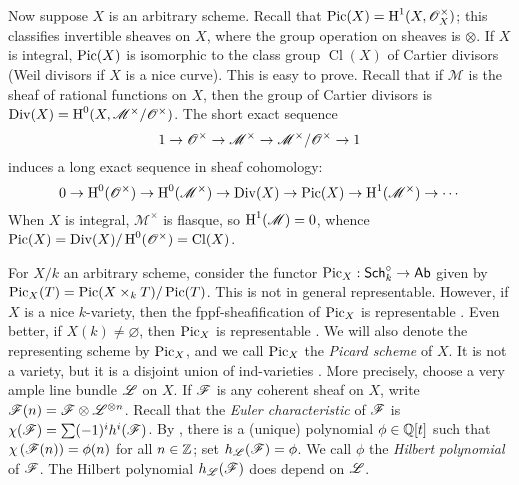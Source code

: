 \documentclass{article}
\begin{document}


Now suppose $X$ is an arbitrary scheme. Recall that 
$\operatorname{Pic}(X)=\operatorname{H}^1(X,\mathscr{O}_X^\times)$; this classifies invertible sheaves on 
$X$, where the group operation on sheaves is $\otimes$. If $X$ is integral, 
$\operatorname{Pic}(X)$ is isomorphic to the class group $\operatorname{Cl}(X)$ of Cartier 
divisors (Weil divisors if $X$ is a nice curve). This is easy to prove. Recall 
that if $\mathscr{M}$ is the sheaf of rational functions on $X$, then the 
group of Cartier divisors is $\operatorname{Div}(X) = \operatorname{H}^0(X,\mathscr{M}^\times/\mathscr{O}^\times)$. 
The short exact sequence 
\[
  1 \to \mathscr{O}^\times \to \mathscr{M}^\times\to \mathscr{M}^\times/\mathscr{O}^\times \to 1
\]
induces a long exact sequence in sheaf cohomology:
\[
  0 \to \operatorname{H}^0(\mathscr{O}^\times) \to \operatorname{H}^0(\mathscr{M}^\times) \to \operatorname{Div}(X) \to \operatorname{Pic}(X) \to \operatorname{H}^1(\mathscr{M}^\times) \to \cdots
\]
When $X$ is integral, $\mathscr{M}^\times$ is flasque, so 
$\operatorname{H}^1(\mathscr{M}) = 0$, whence 
$\operatorname{Pic}(X)=\operatorname{Div}(X)/\operatorname{H}^0(\mathscr{O}^\times) = \operatorname{Cl}(X)$. 

For $X/k$ an arbitrary scheme, consider the functor 
$\operatorname{Pic}_X:\mathsf{Sch}_k^\circ\to\mathsf{Ab}$ given by 
$\operatorname{Pic}_X(T) = \operatorname{Pic}(X\times_k T)/\operatorname{Pic}(T)$. This is not in general 
representable. However, if $X$ is a nice $k$-variety, then the 
fppf-sheafification of $\operatorname{Pic}_X$ is representable \cite[4.1.38]{kl05}. Even 
better, if $X(k)\ne\varnothing$, then $\operatorname{Pic}_X$ is representable 
\cite[2.5]{kl05}. We will also denote the representing scheme by $\operatorname{Pic}_X$, and 
we call $\operatorname{Pic}_X$ the \emph{Picard scheme} of $X$. It is not a variety, but it 
is a disjoint union of ind-varieties \cite[4.8]{kl05}. More precisely, choose 
a very ample line bundle $\mathscr{L}$ on $X$. If $\mathscr{F}$ is any coherent 
sheaf on $X$, write 
$\mathscr{F}(n) = \mathscr{F}\otimes\mathscr{L}^{\otimes n}$. Recall that the 
\emph{Euler characteristic} of $\mathscr{F}$ is 
$\chi(\mathscr{F}) = \sum (-1)^i h^i(\mathscr{F})$. By \cite[2.5.3]{gr61}, 
there is a (unique) polynomial $\phi\in \mathbb{Q}[t]$ such that 
$\chi\left(\mathscr{F}(n)\right) = \phi(n)$ for all 
$n\in\mathbb{Z}$; set $h_{\mathscr{L}}(\mathscr{F}) = \phi$. We call $\phi$ the 
\emph{Hilbert polynomial} of $\mathscr{F}$. The Hilbert polynomial 
$h_{\mathscr{L}}(\mathscr{F})$ does depend on $\mathscr{L}$.
\end{document}
